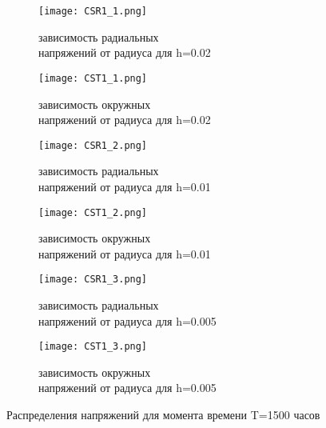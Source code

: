 \documentclass[a4paper,14pt]{extarticle}
\begin{document}
\begin{spacing}{1.0}

\begin{figure*}
\centering

\begin{subfigure}{0.45\textwidth}
\centering
\texttt{[image: CSR1\_1.png]}
\caption{зависимость радиальных \\ напряжений от радиуса для h=0.02}
\label{fig:CS1r201}
\end{subfigure}
\hfill
\begin{subfigure}{0.45\textwidth}
\centering
\texttt{[image: CST1\_1.png]}
\caption{зависимость окружных \\ напряжений от радиуса для h=0.02}
\label{fig:CS1t201}
\end{subfigure}

\vspace{25mm}

\begin{subfigure}{0.45\textwidth}
\centering
\texttt{[image: CSR1\_2.png]}
\caption{зависимость радиальных \\ напряжений от радиуса для h=0.01}
\label{fig:CS1r202}
\end{subfigure}
\hfill
\begin{subfigure}{0.45\textwidth}
\centering
\texttt{[image: CST1\_2.png]}
\caption{зависимость окружных \\ напряжений от радиуса для h=0.01}
\label{fig:CS1t202}
\end{subfigure}

\vspace{25mm}

\begin{subfigure}{0.45\textwidth}
\centering
\texttt{[image: CSR1\_3.png]}
\caption{зависимость радиальных \\ напряжений от радиуса для h=0.005}
\label{fig:CS1r203}
\end{subfigure}
\hfill
\begin{subfigure}{0.45\textwidth}
\centering
\texttt{[image: CST1\_3.png]}
\caption{зависимость окружных \\ напряжений от радиуса для h=0.005}
\label{fig:CS1t203}
\end{subfigure}
\caption{Распределения напряжений для момента времени T=1500 часов}
\label{fig:CS1}
\end{figure*}
\end{spacing}

\newpage
\end{document}
